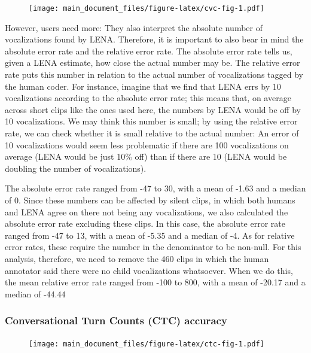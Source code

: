 \documentclass[english,floatsintext,man]{apa6}
\begin{document}
\begin{figure}
\centering
\texttt{[image: main\_document\_files/figure-latex/cvc-fig-1.pdf]}
\caption{}
\end{figure}

However, users need more: They also interpret the absolute number of
vocalizations found by LENA. Therefore, it is important to also bear in
mind the absolute error rate and the relative error rate. The absolute
error rate tells us, given a LENA estimate, how close the actual number
may be. The relative error rate puts this number in relation to the
actual number of vocalizations tagged by the human coder. For instance,
imagine that we find that LENA errs by 10 vocalizations according to the
absolute error rate; this means that, on average across short clips like
the ones used here, the numbers by LENA would be off by 10
vocalizations. We may think this number is small; by using the relative
error rate, we can check whether it is small relative to the actual
number: An error of 10 vocalizations would seem less problematic if
there are 100 vocalizations on average (LENA would be just 10\% off)
than if there are 10 (LENA would be doubling the number of
vocalizations).

The absolute error rate ranged from -47 to 30, with a mean of -1.63 and
a median of 0. Since these numbers can be affected by silent clips, in
which both humans and LENA agree on there not being any vocalizations,
we also calculated the absolute error rate excluding these clips. In
this case, the absolute error rate ranged from -47 to 13, with a mean of
-5.35 and a median of -4. As for relative error rates, these require the
number in the denominator to be non-null. For this analysis, therefore,
we need to remove the 460 clips in which the human annotator said there
were no child vocalizations whatsoever. When we do this, the mean
relative error rate ranged from -100 to 800, with a mean of -20.17 and a
median of -44.44

\subsubsection{Conversational Turn Counts (CTC)
accuracy}\label{conversational-turn-counts-ctc-accuracy}

\begin{figure}
\centering
\texttt{[image: main\_document\_files/figure-latex/ctc-fig-1.pdf]}
\caption{}
\end{figure}
\end{document}
